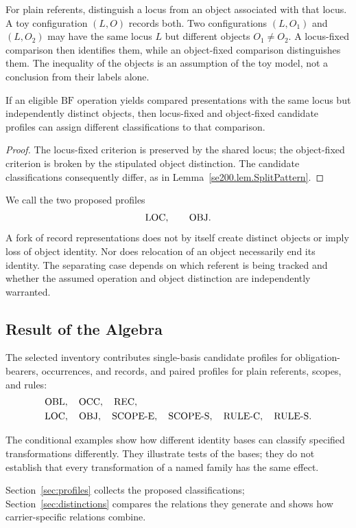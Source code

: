 For plain referents, distinguish a locus from an object associated
with that locus.
A toy configuration $(L,O)$ records both.
Two
configurations $(L,O_1)$ and $(L,O_2)$ may have the same locus $L$
but different objects $O_1\ne O_2$.
A locus-fixed comparison then
identifies them, while an object-fixed comparison distinguishes them.
The inequality of the objects is an assumption of the toy model,
not a conclusion from their labels alone.

\begin{proposition}
  \label{se200.prop.PlainReferentUnderdetermination}
  If an eligible $\mathrm{BF}$ operation yields compared presentations
  with the same locus but independently distinct objects, then
  locus-fixed and object-fixed candidate profiles can assign
  different classifications to that comparison.
\end{proposition}

\begin{proof}
  The locus-fixed criterion is preserved by the shared locus; the
  object-fixed criterion is broken by the stipulated object
  distinction.
  The candidate classifications consequently differ,
  as in Lemma~\ref{se200.lem.SplitPattern}.
\end{proof}

We call the two proposed profiles
\[
  \mathrm{LOC},\qquad \mathrm{OBJ}.
\]
A fork of record representations does not by itself create distinct
objects or imply loss of object identity.
Nor does relocation of an
object necessarily end its identity.
The separating case depends on
which referent is being tracked and whether the assumed operation
and object distinction are independently warranted.

\subsection{Result of the Algebra}
\label{subsec:algebra_result}

The selected inventory contributes single-basis candidate profiles
for obligation-bearers, occurrences, and records, and paired profiles
for plain referents, scopes, and rules:
\[
  \begin{aligned}
     & \mathrm{OBL},\quad \mathrm{OCC},\quad \mathrm{REC},                       \\
     & \mathrm{LOC},\quad \mathrm{OBJ},\quad \mathrm{SCOPE\text{-}E},\quad \mathrm{SCOPE\text{-}S},\quad
    \mathrm{RULE\text{-}C},\quad \mathrm{RULE\text{-}S}.
  \end{aligned}
\]

The conditional examples show how different identity bases can
classify specified transformations differently.
They illustrate tests of the bases; they do not establish that every
transformation of a named family has the same effect.

Section~\ref{sec:profiles} collects the proposed classifications;
Section~\ref{sec:distinctions} compares the relations they generate and
shows how carrier-specific relations combine.
